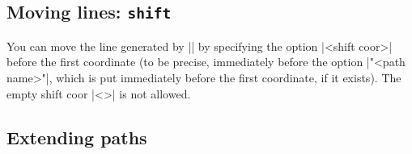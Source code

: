 %
%
%
%
%

\subsection{Moving lines: \texttt{shift}}
\label{ss:tzline:shift}

You can move the line generated by |\tzline| by specifying the option |<shift coor>| before the first coordinate (to be precise, immediately before the option |"<path name>"|, which is put immediately before the first coordinate, if it exists).
The empty shift coor |<>| is not allowed.

\begin{tzcode}{.3}
\end{tzcode}



\subsection{Extending paths}
\label{ss:tzline:extendingpath}

